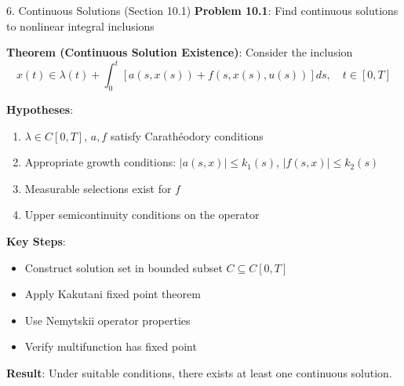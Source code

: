 \documentclass[aspectratio=169,10pt]{beamer}
\begin{document}
\begin{frame}[allowframebreaks]{6. Continuous Solutions (Section 10.1)}
    \textbf{Problem 10.1}: Find continuous solutions to nonlinear integral inclusions

    \vspace{0.3cm}
    \textbf{Theorem (Continuous Solution Existence)}:
    Consider the inclusion
    $$x(t) \in \lambda(t) + \int_0^t [a(s,x(s)) + f(s,x(s),u(s))] ds, \quad t \in [0,T]$$

    \textbf{Hypotheses}:
    \begin{enumerate}
        \item $\lambda \in C[0,T]$, $a, f$ satisfy Carathéodory conditions
        \item Appropriate growth conditions: $|a(s,x)| \leq k_1(s)$, $|f(s,x)| \leq k_2(s)$
        \item Measurable selections exist for $f$
        \item Upper semicontinuity conditions on the operator
    \end{enumerate}

    \vspace{0.4cm}
    \textbf{Key Steps}:
    \begin{itemize}
        \item Construct solution set in bounded subset $C \subseteq C[0,T]$
        \item Apply Kakutani fixed point theorem
        \item Use Nemytskii operator properties
        \item Verify multifunction has fixed point
    \end{itemize}

    \vspace{0.4cm}
    \textbf{Result}: Under suitable conditions, there exists at least one continuous solution.
\end{frame}
\end{document}
